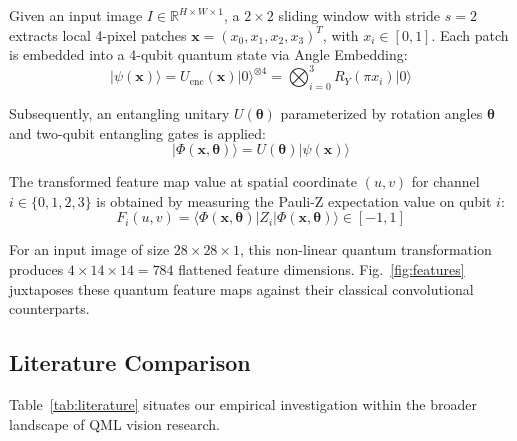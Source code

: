 \documentclass[journal]{IEEEtran}
\begin{document}
Given an input image $I \in \mathbb{R}^{H \times W \times 1}$, a $2 \times 2$ sliding window with stride $s=2$ extracts local 4-pixel patches $\mathbf{x} = (x_0, x_1, x_2, x_3)^T$, with $x_i \in [0, 1]$. Each patch is embedded into a 4-qubit quantum state via Angle Embedding:
\begin{equation}
|\psi(\mathbf{x})\rangle = U_{\text{enc}}(\mathbf{x}) |0\rangle^{\otimes 4} = \bigotimes_{i=0}^{3} R_Y(\pi x_i) |0\rangle
\end{equation}

Subsequently, an entangling unitary $U(\boldsymbol{\theta})$ parameterized by rotation angles $\boldsymbol{\theta}$ and two-qubit entangling gates is applied:
\begin{equation}
|\Phi(\mathbf{x}, \boldsymbol{\theta})\rangle = U(\boldsymbol{\theta}) |\psi(\mathbf{x})\rangle
\end{equation}

The transformed feature map value at spatial coordinate $(u, v)$ for channel $i \in \{0, 1, 2, 3\}$ is obtained by measuring the Pauli-Z expectation value on qubit $i$:
\begin{equation}
F_i(u, v) = \langle \Phi(\mathbf{x}, \boldsymbol{\theta}) | Z_i | \Phi(\mathbf{x}, \boldsymbol{\theta}) \rangle \in [-1, 1]
\end{equation}

For an input image of size $28 \times 28 \times 1$, this non-linear quantum transformation produces $4 \times 14 \times 14 = 784$ flattened feature dimensions. Fig.~\ref{fig:features} juxtaposes these quantum feature maps against their classical convolutional counterparts.

\subsection{Literature Comparison}
Table~\ref{tab:literature} situates our empirical investigation within the broader landscape of QML vision research.
\end{document}
